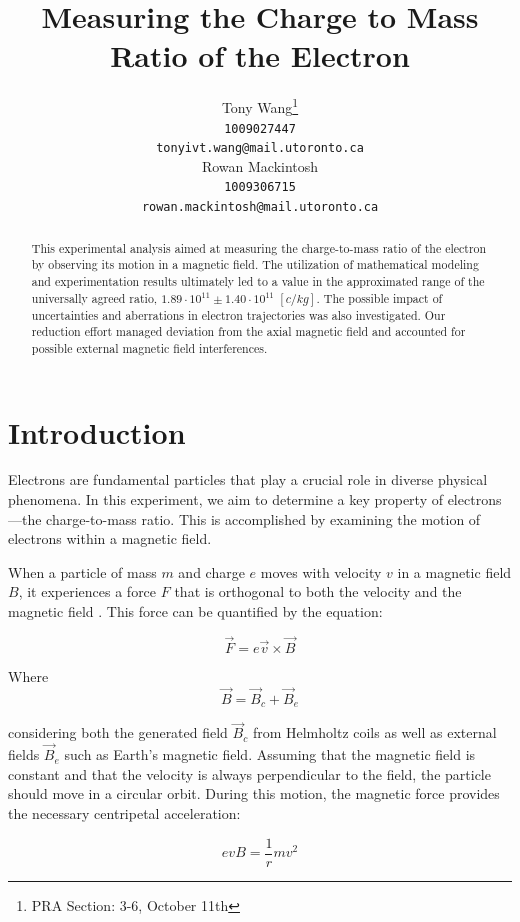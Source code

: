 \documentclass[12pt]{article}
\title{Measuring the Charge to Mass Ratio of the Electron}
\author{
Tony Wang\thanks{PRA Section: 3-6, October 11th} \\
\texttt{1009027447} \\
\texttt{tonyivt.wang@mail.utoronto.ca} \\
\And
Rowan Mackintosh \\
\texttt{1009306715} \\
\texttt{rowan.mackintosh@mail.utoronto.ca} \\
}
\begin{document}
\maketitle
\begin{abstract}
This experimental analysis aimed at measuring the charge-to-mass ratio of the electron by observing its motion in a magnetic field. The utilization of mathematical modeling and experimentation results ultimately led to a value in the approximated range of the universally agreed ratio, $1.89\cdot10^{11}\pm1.40\cdot10^{11}\;\left[c/kg\right]$. The possible impact of uncertainties and aberrations in electron trajectories was also investigated. Our reduction effort managed deviation from the axial magnetic field and accounted for possible external magnetic field interferences.
\end{abstract}
\section*{Introduction}
Electrons are fundamental particles that play a crucial role in diverse physical phenomena. In this experiment, we aim to determine a key property of electrons—the charge-to-mass ratio. This is accomplished by examining the motion of electrons within a magnetic field.

When a particle of mass $m$ and charge $e$ moves with velocity $v$ in a magnetic field $B$, it experiences a force $F$ that is orthogonal to both the velocity and the magnetic field \autocite{PhysRev.45.781}. This force can be quantified by the equation:

\begin{equation}
    \Vec{F} = e\Vec{v} \times \Vec{B}
    \label{eq:f}
\end{equation}

Where 
\begin{equation}
    \Vec{B}=\Vec{B}_c+\Vec{B}_e
    \label{bbb}
\end{equation}

considering both the generated field $\Vec{B}_c$ from Helmholtz coils as well as external fields $\Vec{B}_e$ such as Earth's magnetic field. Assuming that the magnetic field is constant and that the velocity is always perpendicular to the field, the particle should move in a circular orbit. During this motion, the magnetic force provides the necessary centripetal acceleration:

\begin{equation}
    evB = \frac{1}{r} m{v}^{2}
    \label{eq:evB}
\end{equation}
\end{document}
